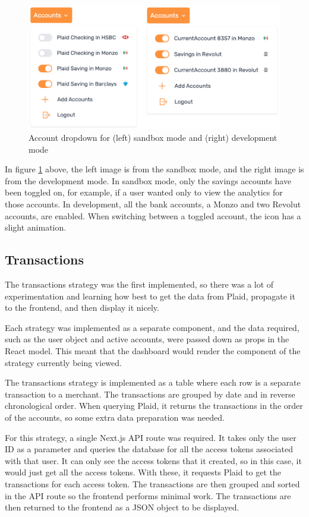 \begin{figure}[H]
	\centering
	\includegraphics[width=\textwidth]{images/accounts_dropdown.png}
	\caption{Account dropdown for (left) sandbox mode and (right) development mode}
	\label{fig:AccountsDropdown}
\end{figure}

In figure \ref{fig:AccountsDropdown} above, the left image is from the sandbox mode, and the right image is from the development mode. In sandbox mode, only the savings accounts have been toggled on, for example, if a user wanted only to view the analytics for those accounts. In development, all the bank accounts, a Monzo and two Revolut accounts, are enabled. When switching between a toggled account, the icon has a slight animation.

\subsection{Transactions}
The transactions strategy was the first implemented, so there was a lot of experimentation and learning how best to get the data from Plaid, propagate it to the frontend, and then display it nicely.

Each strategy was implemented as a separate component, and the data required, such as the user object and active accounts, were passed down as props in the React model. This meant that the dashboard would render the component of the strategy currently being viewed. 

The transactions strategy is implemented as a table where each row is a separate transaction to a merchant. The transactions are grouped by date and in reverse chronological order. When querying Plaid, it returns the transactions in the order of the accounts, so some extra data preparation was needed.

For this strategy, a single Next.js API route was required. It takes only the user ID as a parameter and queries the database for all the access tokens associated with that user. It can only see the access tokens that it created, so in this case, it would just get all the access tokens. With these, it requests Plaid to get the transactions for each access token. The transactions are then grouped and sorted in the API route so the frontend performs minimal work. The transactions are then returned to the frontend as a JSON object to be displayed.


